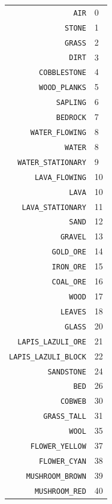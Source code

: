 \documentclass[twocolumn]{geocraft-worksheet-multipage}
\begin{document}
\begin{center}
\begin{supertabular} { | r | l | }
\verb|AIR|                &    0 \\
\verb|STONE|              &    1 \\
\verb|GRASS|               &    2 \\
\verb|DIRT|               &    3 \\
\verb|COBBLESTONE|         &    4 \\
\verb|WOOD_PLANKS|         &    5 \\
\verb|SAPLING|             &    6 \\
\verb|BEDROCK|             &    7 \\
\verb|WATER_FLOWING|       &    8 \\
\verb|WATER|               &    8 \\
\verb|WATER_STATIONARY|    &    9 \\
\verb|LAVA_FLOWING|        &   10 \\
\verb|LAVA|                &   10 \\
\verb|LAVA_STATIONARY|     &   11 \\
\verb|SAND|                &   12 \\
\verb|GRAVEL|              &   13 \\
\verb|GOLD_ORE|            &   14 \\
\verb|IRON_ORE|            &   15 \\
\verb|COAL_ORE|            &   16 \\
\verb|WOOD|                &   17 \\
\verb|LEAVES|              &   18 \\
\verb|GLASS|               &   20 \\
\verb|LAPIS_LAZULI_ORE|    &   21 \\
\verb|LAPIS_LAZULI_BLOCK|  &   22 \\
\verb|SANDSTONE|           &   24 \\
\verb|BED|                 &   26 \\
\verb|COBWEB|              &   30 \\
\verb|GRASS_TALL|          &   31 \\
\verb|WOOL|                &   35 \\
\verb|FLOWER_YELLOW|       &   37 \\
\verb|FLOWER_CYAN|         &   38 \\
\verb|MUSHROOM_BROWN|      &   39 \\
\verb|MUSHROOM_RED|        &   40 \\

\end{supertabular}
\end{center}
\end{document}

